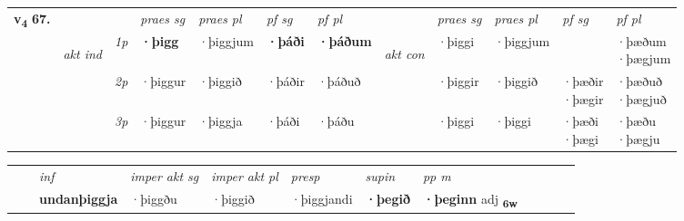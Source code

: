 \begin{tabular}{llllllllllll} \toprule
\multirow{4}{*}{{{\textbf{v{\textsubscript{4}}} \Large{\textbf{67.}}}}}  & &   &  \textit{praes sg}  & \textit{praes pl}  &\textit{ pf sg} & \textit{pf pl} &  &  \textit{praes sg}  & \textit{praes pl}  & \textit{pf sg} & \textit{pf pl } \\*
	\cmidrule{4-7} \cmidrule{9-12}
 & \multirow{3}{*}{\begin{turn}{90}\textit{akt ind}\end{turn}} & {\textit{1p}} & \textbf{·þigg} & ·þiggjum    & \textbf{·þáði} & \textbf{·þáðum} & \multirow{3}{*}{\begin{turn}{90}\textit{akt con}\end{turn}} &·þiggi & ·þiggjum & \textbf{\specialcell{·þæði\\  ·þægi}} & \specialcell{·þæðum\\  ·þægjum}\\*
& &  {\textit{2p}} &  ·þiggur  & ·þiggið   & ·þáðir & ·þáðuð & & ·þiggir & ·þiggið & \specialcell{·þæðir\\  ·þægir} & \specialcell{·þæðuð\\  ·þægjuð} \\*
& &  {\textit{3p}} & ·þiggur & ·þiggja   & ·þáði & ·þáðu & & ·þiggi & ·þiggi& \specialcell{·þæði\\  ·þægi} & \specialcell{·þæðu\\  ·þægju}  \\*
\cmidrule{4-7} \cmidrule{9-12}
\end{tabular}


\begin{tabular}{llllllllllll}
 & & \textit{inf} & \textit{imper akt sg} & \textit{imper akt pl}   & \textit{presp} & \textit{supin}  & \textit{pp m}     \\*
  & & \textbf{undanþiggja} & ·þiggðu  & ·þiggið   & ·þiggjandi &  \textbf{·þegið}  & \textbf{·þeginn} adj \textbf{\textsubscript{6w}} \\*
\cmidrule{1-12}
\end{tabular}



